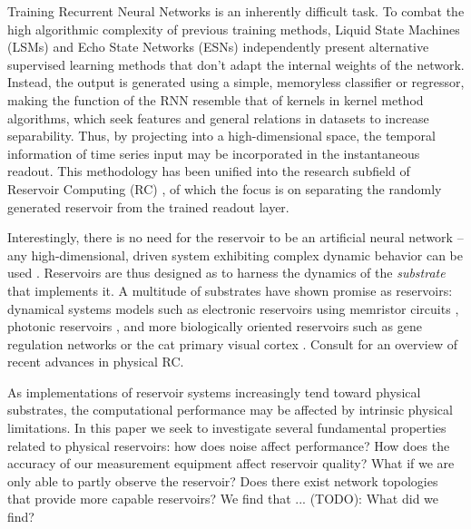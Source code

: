 Training Recurrent Neural Networks is an inherently difficult task. To combat
the high algorithmic complexity of previous training methods, Liquid State
Machines (LSMs) \cite{maass_real-time_2002} and Echo State Networks (ESNs)
\cite{jaeger_echo_2001} independently present alternative supervised learning
methods that don't adapt the internal weights of the network. Instead, the
output is generated using a simple, memoryless classifier or regressor, making
the function of the RNN resemble that of kernels in kernel method algorithms,
which seek features and general relations in datasets to increase
separability. Thus, by projecting into a high-dimensional space, the temporal
information of time series input may be incorporated in the instantaneous
readout. This methodology has been unified into the research subfield of
Reservoir Computing (RC) \cite{schrauwen_overview_2007}, of which the focus is
on separating the randomly generated reservoir from the trained readout layer.

Interestingly, there is no need for the reservoir to be an artificial neural
network -- any high-dimensional, driven system exhibiting complex dynamic
behavior can be used \cite{schrauwen_overview_2007}. Reservoirs are thus
designed as to harness the dynamics of the \textit{substrate} that implements
it. A multitude of substrates have shown promise as reservoirs: dynamical
systems models such as electronic reservoirs using memristor circuits
\cite{kulkarni_memristor-based_2012}, photonic reservoirs
\cite{vandoorne_experimental_2014}, and more biologically oriented reservoirs
such as gene regulation networks \cite{jones_is_2007} or the cat primary visual
cortex \cite{scholkopf_temporal_2007}. Consult \cite{tanaka_recent_2018} for an
overview of recent advances in physical RC.

As implementations of reservoir systems increasingly tend toward physical
substrates, the computational performance may be affected by intrinsic physical
limitations. In this paper we seek to investigate several fundamental properties
related to physical reservoirs: how does noise affect performance? How does the
accuracy of our measurement equipment affect reservoir quality? What if we are
only able to partly observe the reservoir? Does there exist network topologies
that provide more capable reservoirs? We find that ... (TODO): What did we find?




